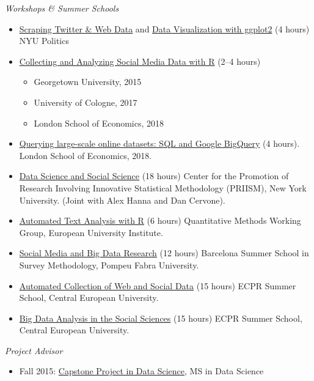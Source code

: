 \documentclass[margin,line,11pt]{resume}
\begin{document}
\begin{resume}
\emph{Workshops \& Summer Schools}
\begin{itemize}
\item \href{https://github.com/pablobarbera/workshop}{Scraping Twitter \& Web Data} and \href{https://github.com/pablobarbera/Rdataviz}{Data Visualization with ggplot2} (4 hours) NYU Politics
\item \href{http://pablobarbera.com/social-media-workshop/}{Collecting and Analyzing Social Media Data with R} (2--4 hours)
\begin{itemize}
\vspace{-.1cm}
\item Georgetown University, 2015
\vspace{-.1cm}
\item University of Cologne, 2017
\vspace{-.1cm}
\item London School of Economics, 2018
\end{itemize}
\item \href{http://pablobarbera.com/SQL-workshop/}{Querying large-scale online datasets: SQL and Google BigQuery} (4 hours). London School of Economics, 2018.
\item \href{https://github.com/pablobarbera/data-science-workshop}{Data Science and Social Science} (18 hours) Center for the Promotion of Research Involving Innovative Statistical Methodology (PRIISM), New York University. (Joint with Alex Hanna and Dan Cervone).
\item \href{https://github.com/pablobarbera/eui-text-workshop}{Automated Text Analysis with R} (6 hours) Quantitative Methods Working Group, European University Institute.
\item \href{https://eventum.upf.edu/event_detail/7273/sections/5650/1st-week-courses.html}{Social Media and Big Data Research} (12 hours) Barcelona Summer School in Survey Methodology, Pompeu Fabra University.
\item \href{https://ecpr.eu/Events/PanelDetails.aspx?PanelID=7055&EventID=116}{Automated Collection of Web and Social Data} (15 hours) ECPR Summer School, Central European University.
\item \href{https://ecpr.eu/Events/PanelDetails.aspx?PanelID=7061&EventID=116}{Big Data Analysis in the Social Sciences} (15 hours) ECPR Summer School, Central European University.
\end{itemize}

\emph{Project Advisor}
\begin{itemize}
\item Fall 2015: \href{http://cds.nyu.edu/academics/ms-in-data-science/curriculum/required-courses/#ds-ga-1006}{Capstone Project in Data Science}, MS in Data Science
\end{itemize}



\end{resume}
\end{document}
